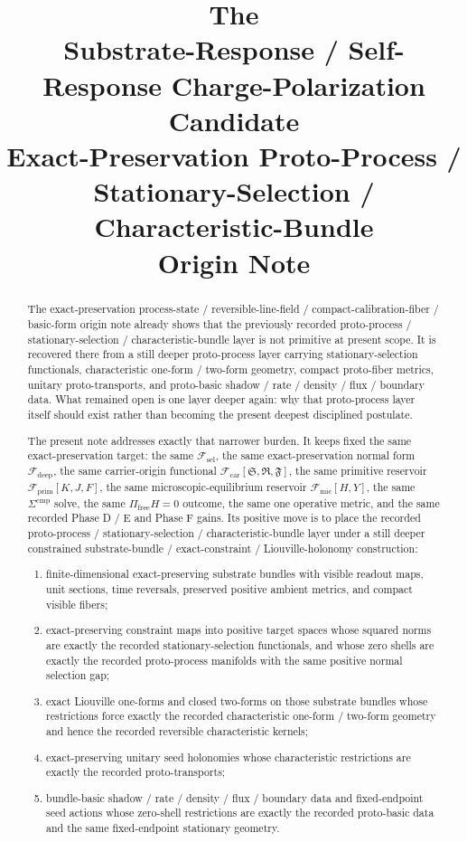 \documentclass[11pt]{article}
\title{\textbf{The \TheoryName{}}\\[0.4em]
\large Substrate-Response / Self-Response Charge-Polarization Candidate\\
\large Exact-Preservation Proto-Process / Stationary-Selection / Characteristic-Bundle\\
\large Origin Note}
\author{}
\date{}
\newcommand{\GaugeAux}{Y}
\newcommand{\MicFunctional}{\mathscr F_{\mathrm{mic}}}
\newcommand{\PrimFunctional}{\mathscr F_{\mathrm{prim}}}
\newcommand{\CarrierFunctional}{\mathscr F_{\mathrm{car}}}
\newcommand{\DeepFunctional}{\mathscr F_{\mathrm{deep}}}
\newcommand{\StemFunctional}{\mathscr F_{\mathrm{sel}}}
\newcommand{\PrimStrain}{K}
\newcommand{\PrimNeutral}{J}
\newcommand{\PrimFree}{F}
\newcommand{\CarrierSeed}{\mathfrak S}
\newcommand{\RelabelSeed}{\mathfrak R}
\newcommand{\FreeSeed}{\mathfrak F}
\begin{document}
\maketitle

\begin{abstract}
The exact-preservation process-state / reversible-line-field / compact-calibration-fiber / basic-form origin note already shows that the previously recorded proto-process / stationary-selection / characteristic-bundle layer is not primitive at present scope. It is recovered there from a still deeper proto-process layer carrying stationary-selection functionals, characteristic one-form / two-form geometry, compact proto-fiber metrics, unitary proto-transports, and proto-basic shadow / rate / density / flux / boundary data. What remained open is one layer deeper again: why that proto-process layer itself should exist rather than becoming the present deepest disciplined postulate.

The present note addresses exactly that narrower burden. It keeps fixed the same exact-preservation target: the same \(\StemFunctional\), the same exact-preservation normal form \(\DeepFunctional\), the same carrier-origin functional \(\CarrierFunctional[\CarrierSeed,\RelabelSeed,\FreeSeed]\), the same primitive reservoir \(\PrimFunctional[\PrimStrain,\PrimNeutral,\PrimFree]\), the same microscopic-equilibrium reservoir \(\MicFunctional[H,\GaugeAux]\), the same \(\Sigma^{\mathrm{cmp}}\) solve, the same \(\Pi_{\mathrm{free}}H=0\) outcome, the same one operative metric, and the same recorded Phase D / E and Phase F gains. Its positive move is to place the recorded proto-process / stationary-selection / characteristic-bundle layer under a still deeper constrained substrate-bundle / exact-constraint / Liouville-holonomy construction:
\begin{enumerate}
    \item finite-dimensional exact-preserving substrate bundles with visible readout maps, unit sections, time reversals, preserved positive ambient metrics, and compact visible fibers;
    \item exact-preserving constraint maps into positive target spaces whose squared norms are exactly the recorded stationary-selection functionals, and whose zero shells are exactly the recorded proto-process manifolds with the same positive normal selection gap;
    \item exact Liouville one-forms and closed two-forms on those substrate bundles whose restrictions force exactly the recorded characteristic one-form / two-form geometry and hence the recorded reversible characteristic kernels;
    \item exact-preserving unitary seed holonomies whose characteristic restrictions are exactly the recorded proto-transports;
    \item bundle-basic shadow / rate / density / flux / boundary data and fixed-endpoint seed actions whose zero-shell restrictions are exactly the recorded proto-basic data and the same fixed-endpoint stationary geometry.
\end{enumerate}


\end{abstract}
\end{document}

